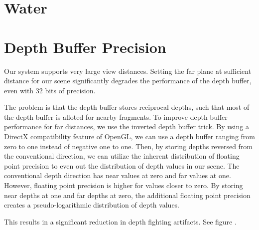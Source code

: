 \section{Water}


\section{Depth Buffer Precision}

Our system supports very large view distances.
Setting the far plane at sufficient distance for our scene significantly degrades the performance of the depth buffer, even with 32 bits of precision.

The problem is that the depth buffer stores reciprocal depths, such that most of the depth buffer is alloted for nearby fragments.
To improve depth buffer performance for far distances, we use the inverted depth buffer trick.
By using a DirectX compatibility feature of OpenGL, we can use a depth buffer ranging from zero to one instead of negative one to one.
Then, by storing depths reversed from the conventional direction, we can utilize the inherent distribution of floating point precision to even out the distribution of depth values in our scene.
The conventional depth direction has near values at zero and far values at one.
However, floating point precision is higher for values closer to zero.
By storing near depths at one and far depths at zero, the additional floating point precision creates a pseudo-logarithmic distribution of depth values.

This results in a significant reduction in depth fighting artifacts.
See figure .

